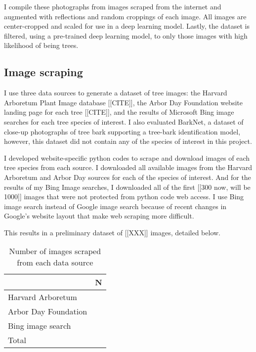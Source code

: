 \documentclass[10pt,twocolumn,letterpaper]{article}
\begin{document}
I compile these photographs from images scraped from the internet and augmented with reflections and random croppings of each image. All images are center-cropped and scaled for use in a deep learning model. Lastly, the dataset is filtered, using a pre-trained deep learning model, to only those images with high likelihood of being trees. 


\subsection{Image scraping}

I use three data sources to generate a dataset of tree images: the Harvard Arboretum Plant Image database [[CITE]], the Arbor Day Foundation website landing page for each tree [[CITE]], and the results of Microsoft Bing image searches for each tree species of interest. I also evaluated BarkNet, a dataset of close-up photographs of tree bark supporting a tree-bark identification model, however, this dataset did not contain any of the species of interest in this project.

I developed website-specific python codes to scrape and download images of each tree species from each source. I downloaded all available images from the Harvard Arboretum and Arbor Day sources for each of the species of interest. And for the results of my Bing Image searches, I downloaded all of the first [[300 now, will be 1000]] images that were not protected from python code web access. I use Bing image search instead of Google image search because of recent changes in Google's website layout that make web scraping more difficult.

This results in a preliminary dataset of [[XXX]] images, detailed below.

\begin{table}
   \begin{center}
   \begin{tabular}{|l|c|}
   \hline
   & N \\
   \hline\hline
   Harvard Arboretum & \\
   Arbor Day Foundation & \\
   Bing image search & \\
   \hline\hline
   Total & \\
   \hline
   \end{tabular}
   \end{center}
   \caption{Number of images scraped from each data source}
   \end{table}
\end{document}
